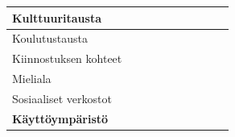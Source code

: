 \documentclass[finnish, 12pt, a4paper, elec, utf8, a-1b, online]{aaltothesis}
\begin{document}
{\begin{longtable}{p{2.5cm}|p{6cm}|p{0.5cm}p{0.5cm}p{0.5cm}|p{0.5cm}|p{0.5cm}p{0.5cm}p{0.5cm}|p{0.5cm}|}
        \midrule
        Kulttuuritausta                                                                                                                                                                                                                                                                                                                                                                                                             \\
        \midrule
        Koulutustausta                                                                                                                                                                                                                                                                                                                                                                                                              \\
        \midrule
        Kiinnostuksen kohteet                                                                                                                                                                                                                                                                                                                                                                                                       \\
        \midrule
        Mieliala                                                                                                                                                                                                                                                                                                                                                                                                                    \\
        \midrule
        Sosiaaliset verkostot                                                                                                                                                                                                                                                                                                                                                                                                       \\
        \midrule
        \textbf{Käyttöympäristö}                                                                                                                                                                                                                                                                                                                                                                                                    \\

\end{longtable}}
\end{document}
